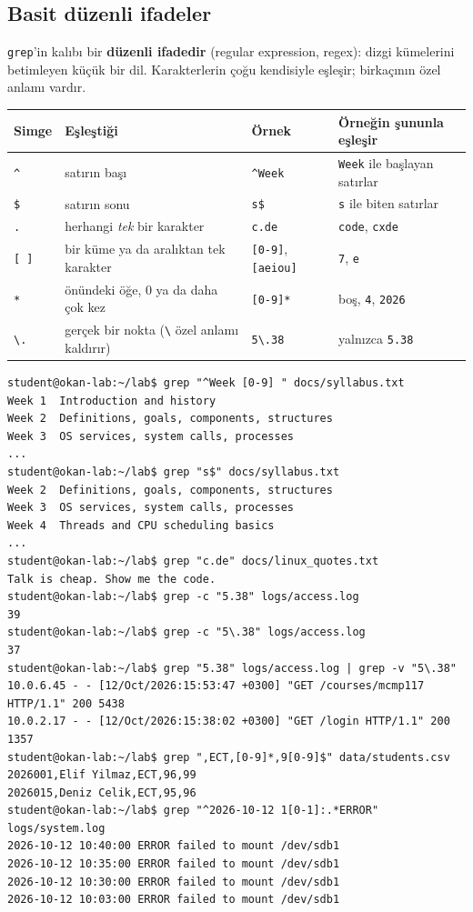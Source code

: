 \documentclass[11pt,a4paper]{article}
\newcommand{\term}[1]{\textbf{\color{mintdeep}#1}}
\newcommand{\cmd}[1]{\texttt{#1}}
\begin{document}
\subsection{Basit düzenli ifadeler}

\cmd{grep}'in kalıbı bir \term{düzenli ifadedir} (regular expression, regex): dizgi kümelerini betimleyen küçük bir dil. Karakterlerin çoğu kendisiyle eşleşir; birkaçının özel anlamı vardır.

\begin{center}
\renewcommand{\arraystretch}{1.2}
\begin{tabular}{@{}lp{4.6cm}lp{3.6cm}@{}}
\toprule
\textbf{Simge} & \textbf{Eşleştiği} & \textbf{Örnek} & \textbf{Örneğin şununla eşleşir}\\
\midrule
\texttt{\textasciicircum} & satırın başı & \texttt{\textasciicircum Week} & \texttt{Week} ile başlayan satırlar\\
\texttt{\$} & satırın sonu & \texttt{s\$} & \texttt{s} ile biten satırlar\\
\texttt{.} & herhangi \emph{tek} bir karakter & \texttt{c.de} & \texttt{code}, \texttt{cxde}\\
\texttt{[ ]} & bir küme ya da aralıktan tek karakter & \texttt{[0-9]}, \texttt{[aeiou]} & \texttt{7}, \texttt{e}\\
\texttt{*} & önündeki öğe, $0$ ya da daha çok kez & \texttt{[0-9]*} & boş, \texttt{4}, \texttt{2026}\\
\texttt{\textbackslash.} & gerçek bir nokta (\texttt{\textbackslash} özel anlamı kaldırır) & \texttt{5\textbackslash.38} & yalnızca \texttt{5.38}\\
\bottomrule
\end{tabular}
\end{center}

\begin{lstlisting}[style=term]
student@okan-lab:~/lab$ grep "^Week [0-9] " docs/syllabus.txt
Week 1  Introduction and history
Week 2  Definitions, goals, components, structures
Week 3  OS services, system calls, processes
...
student@okan-lab:~/lab$ grep "s$" docs/syllabus.txt
Week 2  Definitions, goals, components, structures
Week 3  OS services, system calls, processes
Week 4  Threads and CPU scheduling basics
...
student@okan-lab:~/lab$ grep "c.de" docs/linux_quotes.txt
Talk is cheap. Show me the code.
student@okan-lab:~/lab$ grep -c "5.38" logs/access.log
39
student@okan-lab:~/lab$ grep -c "5\.38" logs/access.log
37
student@okan-lab:~/lab$ grep "5.38" logs/access.log | grep -v "5\.38"
10.0.6.45 - - [12/Oct/2026:15:53:47 +0300] "GET /courses/mcmp117 HTTP/1.1" 200 5438
10.0.2.17 - - [12/Oct/2026:15:38:02 +0300] "GET /login HTTP/1.1" 200 1357
student@okan-lab:~/lab$ grep ",ECT,[0-9]*,9[0-9]$" data/students.csv
2026001,Elif Yilmaz,ECT,96,99
2026015,Deniz Celik,ECT,95,96
student@okan-lab:~/lab$ grep "^2026-10-12 1[0-1]:.*ERROR" logs/system.log
2026-10-12 10:40:00 ERROR failed to mount /dev/sdb1
2026-10-12 10:35:00 ERROR failed to mount /dev/sdb1
2026-10-12 10:30:00 ERROR failed to mount /dev/sdb1
2026-10-12 10:03:00 ERROR failed to mount /dev/sdb1
\end{lstlisting}
\end{document}
